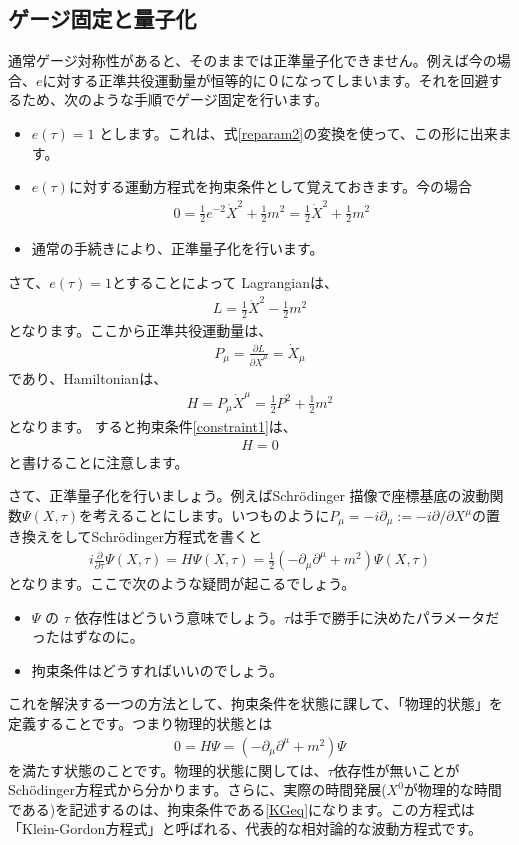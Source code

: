 \documentclass[report,paper=a4, fontsize=12pt, line_length=16cm, number_of_lines=34,dvipdfmx]{jlreq}
\numberwithin{equation}{chapter}
\numberwithin{equation}{section}
\newcommand{\del}{\partial}
\begin{document}
\subsection{ゲージ固定と量子化}
通常ゲージ対称性があると、そのままでは正準量子化できません。例えば今の場合、$e$に対する正準共役運動量が恒等的に０になってしまいます。それを回避するため、次のような手順でゲージ固定を行います。
\begin{itemize}
 \item $e(\tau)=1$ とします。これは、式\eqref{reparam2}の変換を使って、この形に出来ます。
 \item $e(\tau)$に対する運動方程式を拘束条件として覚えておきます。今の場合
\begin{align}
 0=\frac12 e^{-2}\dot{X}^2+\frac12 m^2=\frac12 \dot{X}^2+\frac12 m^2 \label{constraint1}
\end{align}
 \item 通常の手続きにより、正準量子化を行います。
\end{itemize}
さて、$e(\tau)=1$とすることによって Lagrangianは、
\begin{align}
 L=\frac12 \dot{X}^2-\frac12 m^2
\end{align}
となります。ここから正準共役運動量は、
\begin{align}
 P_{\mu}=\frac{\del L}{\del \dot{X}^{\mu}}=\dot{X}_{\mu}
\end{align}
であり、Hamiltonianは、
\begin{align}
 H=P_{\mu}\dot{X}^{\mu}=\frac12 P^2+\frac12 m^2
\end{align}
となります。 すると拘束条件\eqref{constraint1}は、
\begin{align}
 H=0
\end{align}
と書けることに注意します。

さて、正準量子化を行いましょう。例えばSchr\"odinger 描像で座標基底の波動関数$\Psi(X,\tau)$を考えることにします。いつものように$P_{\mu}=-i\del_{\mu}:=-i\del/\del X^{\mu}$の置き換えをしてSchr\"odinger方程式を書くと
\begin{align}
 i\frac{\del}{\del \tau}\Psi(X,\tau)= H \Psi(X,\tau)=\frac12 (-\del_{\mu}\del^{\mu}+m^2)\Psi(X,\tau)
\end{align}
となります。ここで次のような疑問が起こるでしょう。
\begin{itemize}
 \item $\Psi$ の $\tau$ 依存性はどういう意味でしょう。$\tau$は手で勝手に決めたパラメータだったはずなのに。
 \item 拘束条件はどうすればいいのでしょう。
\end{itemize}
これを解決する一つの方法として、拘束条件を状態に課して、「物理的状態」を定義することです。つまり物理的状態とは
\begin{align}
 0=H\Psi=(-\del_{\mu}\del^{\mu}+m^2)\Psi \label{KGeq}
\end{align}
を満たす状態のことです。物理的状態に関しては、$\tau$依存性が無いことがSch\"odinger方程式から分かります。さらに、実際の時間発展($X^0$が物理的な時間である)を記述するのは、拘束条件である\eqref{KGeq}になります。この方程式は「Klein-Gordon方程式」と呼ばれる、代表的な相対論的な波動方程式です。
\end{document}

